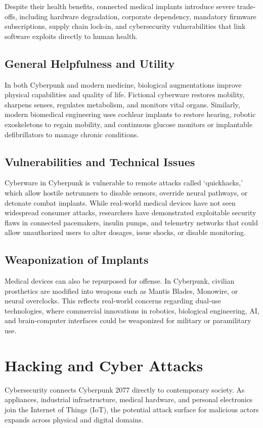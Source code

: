 \documentclass{article}%
\begin{document}
Despite their health benefits, connected medical implants introduce severe trade-offs, including hardware degradation, corporate dependency, mandatory firmware subscriptions, supply chain lock-in, and cybersecurity vulnerabilities that link software exploits directly to human health.

\subsection{General Helpfulness and Utility}
In both Cyberpunk and modern medicine, biological augmentations improve physical capabilities and quality of life. Fictional cyberware restores mobility, sharpens senses, regulates metabolism, and monitors vital organs. Similarly, modern biomedical engineering uses cochlear implants to restore hearing, robotic exoskeletons to regain mobility, and continuous glucose monitors or implantable defibrillators to manage chronic conditions.

\subsection{Vulnerabilities and Technical Issues}
Cyberware in Cyberpunk is vulnerable to remote attacks called `quickhacks,' which allow hostile netrunners to disable sensors, override neural pathways, or detonate combat implants. While real-world medical devices have not seen widespread consumer attacks, researchers have demonstrated exploitable security flaws in connected pacemakers, insulin pumps, and telemetry networks that could allow unauthorized users to alter dosages, issue shocks, or disable monitoring.

\subsection{Weaponization of Implants}
Medical devices can also be repurposed for offense. In Cyberpunk, civilian prosthetics are modified into weapons such as Mantis Blades, Monowire, or neural overclocks. This reflects real-world concerns regarding dual-use technologies, where commercial innovations in robotics, biological engineering, AI, and brain-computer interfaces could be weaponized for military or paramilitary use.

\section{Hacking and Cyber Attacks}
Cybersecurity connects Cyberpunk 2077 directly to contemporary society. As appliances, industrial infrastructure, medical hardware, and personal electronics join the Internet of Things (IoT), the potential attack surface for malicious actors expands across physical and digital domains.
\end{document}
